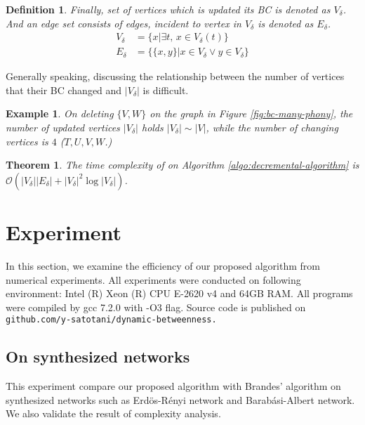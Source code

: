\documentclass{article}
\newtheorem{definition}{Definition}
\newtheorem{example}{Example}
\newtheorem{theorem}{Theorem}
\begin{document}
\begin{definition}
  
  Finally, set of vertices which is updated its BC is denoted as $V_\delta$.
  And an edge set consists of edges, incident to vertex in $V_\delta$ is denoted as $E_\delta$.
  \begin{equation*}
    \begin{aligned}
      V_\delta&=\{x|\exists t,\,x\in V_\delta(t)\} \\
      E_\delta&=\{\{x,y\}|x\in V_\delta\lor y\in V_\delta\}
    \end{aligned}
  \end{equation*}
\end{definition}

Generally speaking, discussing the relationship between the number of vertices that their BC changed and $\lvert V_\delta\rvert$ is difficult.

\begin{example}
  On deleting $\{V,W\}$ on the graph in Figure \ref{fig:bc-many-phony}, the number of updated vertices $\lvert V_\delta\rvert$ holds $\lvert V_\delta\rvert\sim \lvert V\rvert$,
  while the number of changing vertices is $4$ ($T,U,V,W$.)
\end{example}
\begin{figure*}[tb]
  \centering
  \def\svgwidth{.8\linewidth}
  
  \caption{Example of network with many unnecessary updates}
  \label{fig:bc-many-phony}
\end{figure*}

\begin{theorem}
  \label{tm:time-complexity}
  The time complexity of  on Algorithm \ref{algo:decremental-algorithm} is
  $\mathcal{O}(\lvert V_\delta\rvert\lvert E_\delta\rvert+\lvert V_\delta\rvert^2\log \lvert V_\delta\rvert)$.
\end{theorem}

\section{Experiment}
In this section, we examine the efficiency of our proposed algorithm from numerical experiments.
All experiments were conducted on following environment: Intel (R) Xeon (R) CPU E-2620 v4 and 64GB RAM. All programs were compiled by gcc 7.2.0 with -O3 flag.
Source code is published on \verb|github.com/y-satotani/dynamic-betweenness.|

\subsection*{On synthesized networks}
This experiment compare our proposed algorithm with Brandes' algorithm on synthesized networks such as Erd{\"{o}}s-R{\'{e}}nyi network\cite{Erdos1959} and Barab{\'{a}}si-Albert network\cite{Barabasi1999}.
We also validate the result of complexity analysis.
\end{document}
